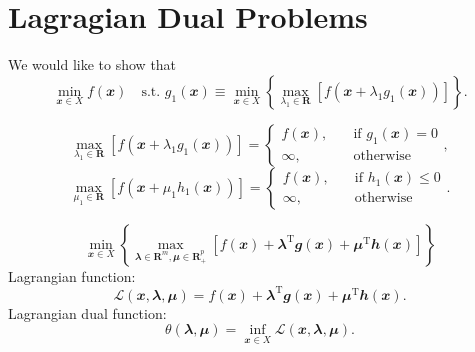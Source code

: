 \documentclass[math, code]{amznotes}
\theoremstyle{remark}
\begin{document}
\chapter{Lagragian Dual Problems}
We would like to show that
\begin{equation*}
    \min_{\mathbfit{x} \in X} f(\mathbfit{x}) \quad\textrm{s.t. } g_1(\mathbfit{x})\equiv \min_{\mathbfit{x} \in X}\left\{\max_{\lambda_1 \in \mathbf{R}}\left[f(\mathbfit{x} + \lambda_1g_1(\mathbfit{x}))\right]\right\}.
\end{equation*}
\begin{probox}{}{}
    \begin{equation*}
        \max_{\lambda_1 \in \mathbf{R}}\left[f(\mathbfit{x} + \lambda_1g_1(\mathbfit{x}))\right] = \begin{cases}
            f(\mathbfit{x}), &\quad\textrm{if } g_1(\mathbfit{x}) = 0 \\
            \infty, &\quad\textrm{otherwise}
        \end{cases},
    \end{equation*}
    \begin{equation*}
        \max_{\mu_1 \in \mathbf{R}}\left[f(\mathbfit{x} + \mu_1h_1(\mathbfit{x}))\right] = \begin{cases}
            f(\mathbfit{x}), &\quad\textrm{if } h_1(\mathbfit{x}) \leq 0 \\
            \infty, &\quad\textrm{otherwise}
        \end{cases}.
    \end{equation*}
\end{probox}
\begin{equation*}
    \min_{\mathbfit{x} \in X}\left\{\max_{\mathbfit{\lambda} \in \mathbf{R}^m, \mathbfit{\mu} \in \mathbf{R}^p_+}\left[f(\mathbfit{x}) + \mathbfit{\lambda}^{\mathrm{T}}\mathbfit{g}(\mathbfit{x}) + \mathbfit{\mu}^{\mathrm{T}}\mathbfit{h}(\mathbfit{x})\right]\right\}
\end{equation*}
Lagrangian function:
\begin{equation*}
    \mathcal{L}(\mathbfit{x}, \mathbfit{\lambda}, \mathbfit{\mu}) = f(\mathbfit{x}) + \mathbfit{\lambda}^{\mathrm{T}}\mathbfit{g}(\mathbfit{x}) + \mathbfit{\mu}^{\mathrm{T}}\mathbfit{h}(\mathbfit{x}).
\end{equation*}
Lagrangian dual function:
\begin{equation*}
    \theta(\mathbfit{\lambda}, \mathbfit{\mu}) = \inf_{\mathbfit{x} \in X} \mathcal{L}(\mathbfit{x}, \mathbfit{\lambda}, \mathbfit{\mu}).
\end{equation*}
\end{document}

